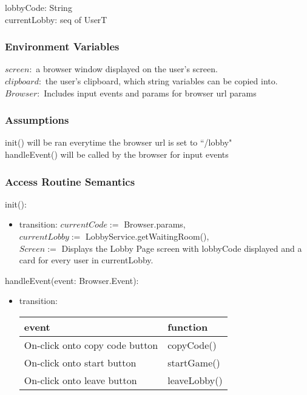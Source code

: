 \documentclass[12pt, titlepage]{article}
\begin{document}
lobbyCode: String\\
currentLobby: seq of UserT

\subsubsection{Environment Variables}

$screen: $ a browser window displayed on the user's screen. \\
$clipboard: $ the user's clipboard, which string variables can be copied into.\\
$Browser: $ Includes input events and params for browser url params

\subsubsection{Assumptions}

init() will be ran everytime the browser url is set to ``/lobby"\\
handleEvent() will be called by the browser for input events

\subsubsection{Access Routine Semantics}

\noindent init():
\begin{itemize}
\item transition: $currentCode := $ Browser.params,\\
$currentLobby :=$ LobbyService.getWaitingRoom(),\\
$Screen := $ Displays the Lobby Page screen with lobbyCode displayed and a card for every user in currentLobby.
\end{itemize}



\noindent handleEvent(event: Browser.Event):
\begin{itemize}
\item transition: \begin{tabular}{p{5cm} p{4cm}}
\hline
\textbf{event} & \textbf{function} \\
\hline
On-click onto copy code button & copyCode() \\
On-click onto start button & startGame() \\
On-click onto leave button & leaveLobby() \\
\hline
\end{tabular}
    
\end{itemize}
\end{document}
